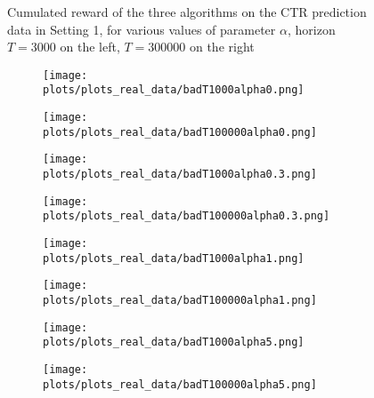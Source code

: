 \begin{APPENDICES}
\begin{figure}[htb]
\begin{centering}
\caption{Cumulated reward of the three algorithms on the CTR prediction data in Setting 1, for various values of parameter $\alpha$, horizon $T=3000$ on the left, $T=300000$ on the right}

\label{fig:plotavcumrewardsetting1}
\end{centering}
\end{figure}

\begin{figure}[htb]
\begin{centering}
\begin{subfigure}{.48\textwidth}
  \centering
  \texttt{[image: plots/plots\_real\_data/badT1000alpha0.png]}
\end{subfigure}%
\begin{subfigure}{.48\textwidth}
  \centering
  \texttt{[image: plots/plots\_real\_data/badT100000alpha0.png]}
\end{subfigure}
\begin{subfigure}{.48\textwidth}
  \centering
  \texttt{[image: plots/plots\_real\_data/badT1000alpha0.3.png]}
\end{subfigure}%
\begin{subfigure}{.48\textwidth}
  \centering
  \texttt{[image: plots/plots\_real\_data/badT100000alpha0.3.png]}
\end{subfigure}
\begin{subfigure}{.48\textwidth}
  \centering
  \texttt{[image: plots/plots\_real\_data/badT1000alpha1.png]}
\end{subfigure}%
\begin{subfigure}{.48\textwidth}
  \centering
  \texttt{[image: plots/plots\_real\_data/badT100000alpha1.png]}
\end{subfigure}
\begin{subfigure}{.48\textwidth}
  \centering
  \texttt{[image: plots/plots\_real\_data/badT1000alpha5.png]}
\end{subfigure}%
\begin{subfigure}{.48\textwidth}
  \centering
  \texttt{[image: plots/plots\_real\_data/badT100000alpha5.png]}
\end{subfigure}



\end{centering}
\end{figure}
\end{APPENDICES}

